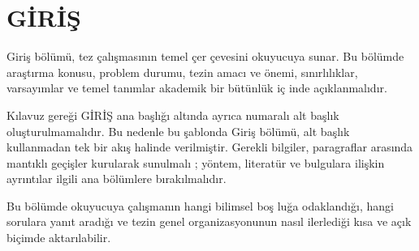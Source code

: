\chapter{G\.{I}R\.{I}\c{S}}

\label{giris} 

Giri\c{s} b\"{o}l\"{u}m\"{u}, tez \c{c}al\i{}\c{s}mas\i{}n\i{}n temel \c{c}er%
\c{c}evesini okuyucuya sunar. Bu b\"{o}l\"{u}mde ara\c{s}t\i{}rma konusu,
problem durumu, tezin amac\i{} ve \"{o}nemi, s\i{}n\i{}rl\i{}l\i{}klar,
varsay\i{}mlar ve temel tan\i{}mlar akademik bir b\"{u}t\"{u}nl\"{u}k i\c{c}%
inde a\c{c}\i{}klanmal\i{}d\i{}r.

K\i{}lavuz gere\u{g}i G\.{I}R\.{I}\c{S} ana ba\c{s}l\i{}\u{g}\i{} alt\i{}nda
ayr\i{}ca numaral\i{} alt ba\c{s}l\i{}k olu\c{s}turulmamal\i{}d\i{}r. Bu
nedenle bu \c{s}ablonda Giri\c{s} b\"{o}l\"{u}m\"{u}, alt ba\c{s}l\i{}k
kullanmadan tek bir ak\i{}\c{s} halinde verilmi\c{s}tir. Gerekli bilgiler,
paragraflar aras\i{}nda mant\i{}kl\i{} ge\c{c}i\c{s}ler kurularak sunulmal\i{%
}; y\"{o}ntem, literat\"{u}r ve bulgulara ili\c{s}kin ayr\i{}nt\i{}lar
ilgili ana b\"{o}l\"{u}mlere b\i{}rak\i{}lmal\i{}d\i{}r.

Bu b\"{o}l\"{u}mde okuyucuya \c{c}al\i{}\c{s}man\i{}n hangi bilimsel bo\c{s}%
lu\u{g}a odakland\i{}\u{g}\i{}, hangi sorulara yan\i{}t arad\i{}\u{g}\i{} ve
tezin genel organizasyonunun nas\i{}l ilerledi\u{g}i k\i{}sa ve a\c{c}\i{}k
bi\c{c}imde aktar\i{}labilir.

